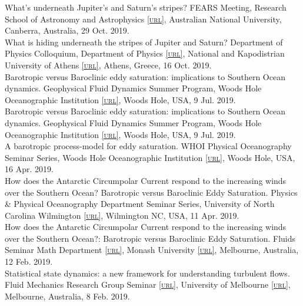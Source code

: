 \documentclass[10pt, letter]{article}
\def\www{http://www.navidconstantinou.com}
\newcommand{\html}[1]{\href{#1}{\scriptsize\textsc{[url]}}}
\begin{document}
What's underneath Jupiter's and Saturn's stripes? FEARS Meeting, Research School of Astronomy and Astrophysics \html{http://rsaa.anu.edu.au/}, Australian National University, Canberra, Australia, 29 Oct. 2019. \href{\www/presentations/RSAA-MagneticViscosity_Oct2019.pdf}{{}}\\[.2cm]
What is hiding underneath the stripes of Jupiter and Saturn? Department of Physics Colloquium, Department of Physics \html{http://en.phys.uoa.gr/}, National and Kapodistrian University of Athens \html{http://en.uoa.gr/}, Athens, Greece, 16 Oct. 2019. \href{\www/presentations/UoA-MagneticViscosity_Oct2019.pdf}{{}}\\[.2cm]
Barotropic versus Baroclinic eddy saturation: implications to Southern Ocean dynamics. Geophysical Fluid Dynamics Summer Program, Woods Hole Oceanographic Institution \html{https://www.whoi.edu/gfd}, Woods Hole, USA, 9 Jul. 2019. \href{\www/presentations/EddySaturation-GFD-2019.pdf}{{}}\\[.2cm]
Barotropic versus Baroclinic eddy saturation: implications to Southern Ocean dynamics. Geophysical Fluid Dynamics Summer Program, Woods Hole Oceanographic Institution \html{https://www.whoi.edu/gfd}, Woods Hole, USA, 9 Jul. 2019. \href{\www/presentations/EddySaturation-GFD-2019.pdf}{{}}\\[.2cm]
A barotropic process-model for eddy saturation. WHOI Physical Oceanography Seminar Series, Woods Hole Oceanographic Institution \html{https://www.whoi.edu}, Woods Hole, USA, 16 Apr. 2019. \href{http://www.navidconstantinou.com/presentations/WHOI_Apr2019.pdf}{{}}\\[.2cm]
How does the Antarctic Circumpolar Current respond to the increasing winds over the Southern Ocean?
Barotropic versus Baroclinic Eddy Saturation. Physics \& Physical Oceanography Department Seminar Series, University of North Carolina Wilmington \html{https://uncw.edu/phy/}, Wilmington NC, USA, 11 Apr. 2019.\\[.2cm]
How does the Antarctic Circumpolar Current respond to the increasing winds over the Southern Ocean?: Barotropic versus Baroclinic Eddy Saturation. Fluids Seminar Math Department \html{https://www.monash.edu/science/schools/mathematical-sciences}, Monash University \html{https://www.monash.edu}, Melbourne, Australia, 12 Feb. 2019.\\[.2cm]
Statistical state dynamics: a new framework for understanding turbulent flows. Fluid Mechanics Research Group Seminar \html{https://fluids.eng.unimelb.edu.au}, University of Melbourne \html{https://www.unimelb.edu.au}, Melbourne, Australia, 8 Feb. 2019.\\[.2cm]
\end{document}
